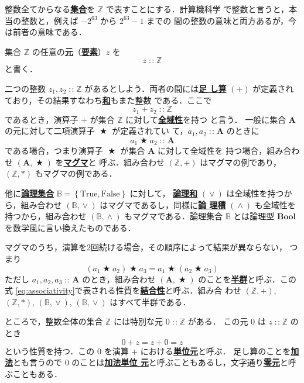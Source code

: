 \documentclass[a5paper,twoside,fleqn]{jsbook}
\newcommand{\keyword}[1]{{\underline{\textbf{#1}}}}
\newcommand{\mSpecialConstant}[1]{\textrm{#1}} %
\newcommand{\mFalse}{\mSpecialConstant{False}}
\newcommand{\mTrue}{\mSpecialConstant{True}}
\DeclareMathOperator{\mBinOp}{\bigstar}
\DeclareMathOperator{\mIn}{{:\!:}}
\DeclareMathOperator{\mLogicalAnd}{\wedge}
\DeclareMathOperator{\mLogicalOr}{\vee}
\newcommand{\mSet}[1]{\mathbf{#1}}
\newcommand{\mSpecialSet}[1]{\mathbb{#1}} %
\newcommand{\mBSet}{\mSpecialSet{B}}
\newcommand{\mZSet}{\mSpecialSet{Z}}
\newcommand{\mType}[1]{\mathbf{#1}}
\newcommand{\mBoolType}{\mType{Bool}}
\newcommand{\mSetWith}[1]{\left\{#1\right\}}
\newcommand{\mTupleWith}[1]{\left(#1\right)}
\begin{document}
整数全てからなる\keyword{集合}を $\mZSet$ で表すことにする．計算機科学
で整数と言うと，本当の整数と，例えば $-2^{63}$ から $2^{63}-1$ までの
間の整数の意味と両方あるが，今は前者の意味である．

集合 $\mZSet$ の任意の\keyword{元}（\keyword{要素}）$z$ を
\begin{equation}
z\mIn\mZSet
\end{equation}
と書く．

二つの整数 $z_1,z_2\mIn\mZSet$ があるとしよう．両者の間には\keyword{足
  し算} $(+)$ が定義されており，その結果すなわち\keyword{和}もまた整数
である．ここで
\begin{equation}
z_1+z_2\mIn\mZSet
\end{equation}
であるとき，演算子 $+$ が集合 $\mZSet$ に対して\keyword{全域性}を持つ
と言う．
一般に集合 $\mSet{A}$ の元に対して二項演算子 $\mBinOp$ が定義されてい
て，$a_1,a_2\mIn\mSet{A}$ のときに
\begin{equation}
\label{eq:totality}
a_1\mBinOp a_2\mIn\mSet{A}
\end{equation}
である場合，つまり演算子 $\mBinOp$ が集合 $\mSet{A}$ に対して全域性を
持つ場合，組み合わせ $\mTupleWith{\mSet{A},\mBinOp}$ を\keyword{マグマ}と
呼ぶ．組み合わせ $\mTupleWith{\mZSet,+}$ はマグマの例であり，
$\mTupleWith{\mZSet,*}$ もマグマの例である．

他に\keyword{論理集合} $\mBSet=\mSetWith{\mTrue,\mFalse}$ に対して，
\keyword{論理和} $(\mLogicalOr)$ は全域性を持つから，組み合わせ
$\mTupleWith{\mBSet,\mLogicalOr}$ はマグマであるし，同様に\keyword{論
  理積} $(\mLogicalAnd)$ も全域性を持つから，組み合わせ
$\mTupleWith{\mBSet,\mLogicalAnd}$ もマグマである．論理集合 $\mBSet$
とは論理型 $\mBoolType$ を数学風に言い換えたものである．

マグマのうち，演算を2回続ける場合，その順序によって結果が異ならない，
つまり
\begin{equation}
\label{eq:associativity}
\left(a_1\mBinOp a_2\right)\mBinOp a_3
=a_1\mBinOp\left(a_2\mBinOp{a_3}\right)
\end{equation}
ただし $a_1,a_2,a_3\mIn\mSet{A}$ のとき，組み合わせ
$\mTupleWith{\mSet{A},\mBinOp}$ のことを\keyword{半群}と呼ぶ．この式
\eqref{eq:associativity}で表される性質を\keyword{結合性}と呼ぶ．組み合
わせ $\mTupleWith{\mZSet,+}$, $\mTupleWith{\mZSet,*}$,
$\mTupleWith{\mBSet,\mLogicalOr}$, $\mTupleWith{\mBSet,\mLogicalOr}$
はすべて半群である．

ところで，整数全体の集合 $\mZSet$ には特別な元 $0\mIn\mZSet$ がある．
この元 $0$ は $z\mIn\mZSet$ のとき
\begin{equation}
0+z=z+0=z
\end{equation}
という性質を持つ．この $0$ を演算 $+$ における\keyword{単位元}と呼ぶ．
足し算のことを\keyword{加法}とも言うので $0$ のことは\keyword{加法単位
  元}と呼ぶこともあるし，文字通り\keyword{零元}と呼ぶこともある．
\end{document}
